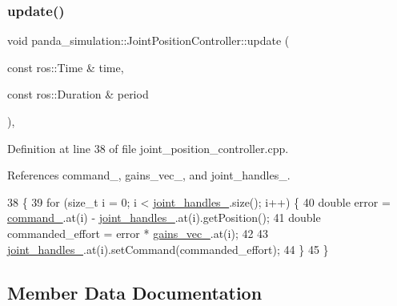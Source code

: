 \subsubsection{\texorpdfstring{update()}{update()}}
{\footnotesize\ttfamily void panda\+\_\+simulation\+::\+Joint\+Position\+Controller\+::update (\begin{DoxyParamCaption}\item[{const ros\+::\+Time \&}]{time,  }\item[{const ros\+::\+Duration \&}]{period }\end{DoxyParamCaption})\hspace{0.3cm}{\ttfamily [inline]}, {\ttfamily [private]}}



Definition at line 38 of file joint\+\_\+position\+\_\+controller.\+cpp.



References command\+\_\+, gains\+\_\+vec\+\_\+, and joint\+\_\+handles\+\_\+.


\begin{DoxyCode}
38                                                               \{
39     \textcolor{keywordflow}{for} (\textcolor{keywordtype}{size\_t} i = 0; i < \hyperlink{classpanda__simulation_1_1JointPositionController_ada43d341b944aece64c6c6928cbc9060}{joint\_handles\_}.size(); i++) \{
40       \textcolor{keywordtype}{double} error = \hyperlink{classpanda__simulation_1_1JointPositionController_ab383d39c84291789c8b51c2b4ea08439}{command\_}.at(i) - \hyperlink{classpanda__simulation_1_1JointPositionController_ada43d341b944aece64c6c6928cbc9060}{joint\_handles\_}.at(i).getPosition();
41       \textcolor{keywordtype}{double} commanded\_effort = error * \hyperlink{classpanda__simulation_1_1JointPositionController_ad673fc63239d994614aa233965d391e9}{gains\_vec\_}.at(i);
42 
43       \hyperlink{classpanda__simulation_1_1JointPositionController_ada43d341b944aece64c6c6928cbc9060}{joint\_handles\_}.at(i).setCommand(commanded\_effort);
44     \}
45   \}
\end{DoxyCode}


\subsection{Member Data Documentation}
\mbox{\label{classpanda__simulation_1_1JointPositionController_ab383d39c84291789c8b51c2b4ea08439}} 
